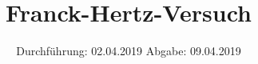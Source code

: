 

\subject{V601}
\title{Franck-Hertz-Versuch}
\date{%
Durchführung: {02.04.2019}
\hspace{3em}
Abgabe: {09.04.2019}
}



\maketitle
\thispagestyle{empty}
\tableofcontents
\newpage





\printbibliography{}


